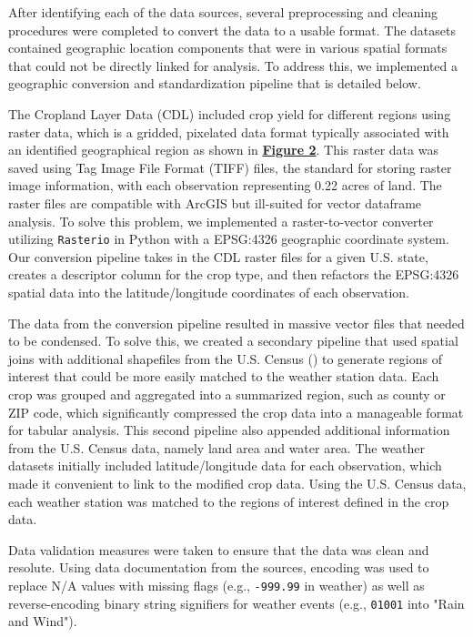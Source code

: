 \documentclass{article}
\begin{document}
\hspace{.5cm}After identifying each of the data sources, several preprocessing and cleaning procedures were completed to convert the data to a usable format. The datasets contained geographic location components that were in various spatial formats that could not be directly linked for analysis.  To address this, we implemented a geographic conversion and standardization pipeline that is detailed below.

The Cropland Layer Data (CDL) included crop yield for different regions using raster data, which is a gridded, pixelated data format typically associated with an identified geographical region as shown in \textbf{\hyperref[sec:raster]{Figure 2}}. This raster data was saved using Tag Image File Format (TIFF) files, the standard for storing raster image information, with each observation representing 0.22 acres of land. The raster files are compatible with ArcGIS but ill-suited for vector dataframe analysis. To solve this problem, we implemented a raster-to-vector converter utilizing \texttt{Rasterio} in Python with a EPSG:4326 geographic coordinate system. Our conversion pipeline takes in the CDL raster files for a given U.S. state, creates a descriptor column for the crop type, and then refactors the EPSG:4326 spatial data into the latitude/longitude coordinates of each observation. 

The data from the conversion pipeline resulted in massive vector files that needed to be condensed. To solve this, we created a secondary pipeline that used spatial joins with additional shapefiles from the U.S. Census (\citeyear{TIGER}) to generate regions of interest that could be more easily matched to the weather station data. Each crop was grouped and aggregated into a summarized region, such as county or ZIP code, which significantly compressed the crop data into a manageable format for tabular analysis. This second pipeline also appended additional information from the U.S. Census data, namely land area and water area. The weather datasets initially included latitude/longitude data for each observation, which made it convenient to link to the modified crop data. Using the U.S. Census data, each weather station was matched to the regions of interest defined in the crop data. 

Data validation measures were taken to ensure that the data was clean and resolute. Using data documentation from the sources, encoding was used to replace N/A values with missing flags (e.g., \texttt{-999.99} in weather) as well as reverse-encoding binary string signifiers for weather events (e.g., \texttt{01001} into "Rain and Wind"). 
\end{document}
